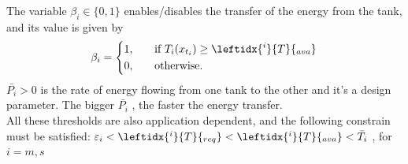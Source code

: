 The variable $\beta_{i} \in \lbrace 0, 1 \rbrace$ enables/disables the transfer of the energy from the tank, and its value is given by
\begin{equation}
	\left.
	\beta_{i} =
	\begin{dcases}
		1, \quad & \mbox{if} \ T_{i}(x_{t_{i}}) \geq \leftidx{^i}{T}{_{ava}}\\
		0, \quad & \mbox{otherwise}.
		\end{dcases}
	\right.
\end{equation}
$\bar{P_{i}} > 0$ is the rate of energy flowing from one tank to the other and it's a design parameter. The bigger $\bar{P_{i}}$ , the faster the energy transfer.\\
All  these thresholds are also application dependent, and the following constrain must be satisfied: $\varepsilon_{i} < \leftidx{^i}{T}{_{req}} < \leftidx{^i}{T}{_{ava}} < \bar{T}_{i}$ , for $i=m,s$\\

